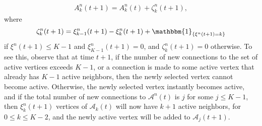 \documentclass[11pt,a4paper, reqno]{article}
\begin{document}
\begin{equation}\label{defn:A-k-n}
 \begin{split}
  A_k^n(t+1)= A_k^n(t)+\zeta_{ k}^n(t+1),
 \end{split}
\end{equation}where
\begin{equation}
 \zeta_{ k}^n(t+1)=\xi_{k-1}^n(t+1)-\xi_k^n(t+1)+ {\ensuremath{\mathbbm{1}_{\left\{{\xi^{n}(t+1)=k}\right\}}}}
\end{equation}
if $\xi^n(t+1)\leq K-1$ and $\xi^n_{K-1}(t+1)=0$, and $\zeta_{ k}^n(t+1)=0$ otherwise.
To see this, observe that at time $t+1$, if the number of new connections to the set of active vertices exceeds $K-1$, or a connection is made to some active vertex that already has $K-1$ active neighbors, then the newly selected vertex cannot become active. Otherwise, the newly selected vertex instantly becomes active, and if the total number of new connections to $\mathcal{A}^n(t)$ is $j$ for some $j\leq K-1$, then $\xi^n_{k}(t+1)$ vertices of $\mathcal{A}_k(t)$ will now have $k+1$ active neighbors, for $0\leq k\leq K-2$, and the newly active vertex will be added to $\mathcal{A}_j(t+1)$.
\end{document}
